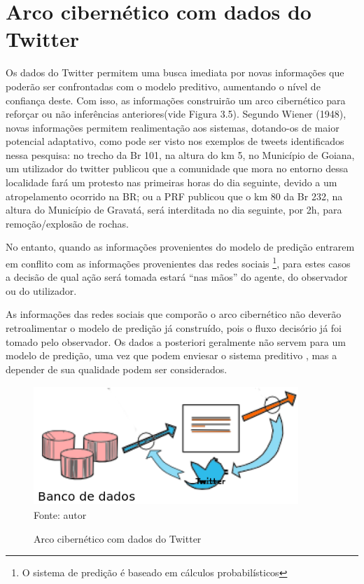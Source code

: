 \section{Arco cibernético com dados do Twitter}

Os dados do Twitter permitem uma busca imediata por novas informações que poderão ser confrontadas com o 
modelo preditivo, aumentando o nível de confiança deste. Com isso, as informações construirão um arco cibernético para reforçar ou não inferências anteriores(vide Figura 3.5). Segundo Wiener (1948), novas informações permitem realimentação aos sistemas, dotando-os de maior potencial adaptativo, como pode ser visto nos exemplos de tweets identificados nessa pesquisa: no trecho da Br 101, na altura do km 5, no 
Município de Goiana, um utilizador do twitter publicou que a comunidade que mora no entorno dessa localidade fará um protesto nas primeiras horas do dia seguinte, devido a um  
atropelamento ocorrido na BR; ou a PRF publicou que o km 80 da Br 232, na altura do Município de Gravatá, será interditada no dia seguinte, por 2h, para 
remoção/explosão de rochas.

No entanto, quando as informações provenientes do modelo de predição entrarem em conflito com as informações 
provenientes das redes sociais \footnote{O sistema de predição é baseado em cálculos probabilísticos}, para estes casos a decisão de qual ação será tomada estará ``nas mãos'' do agente, do observador ou do utilizador.

As informações das redes sociais que comporão o arco cibernético não deverão retroalimentar o modelo de predição já construído, pois o fluxo decisório já foi tomado pelo observador. Os dados a posteriori geralmente não servem para um modelo de predição, uma vez que podem enviesar o sistema preditivo {, mas a depender de sua qualidade podem ser considerados}.

\begin{figure}[ht]
	\centering
	\caption{Arco cibernético com dados do Twitter}
	\includegraphics[width=100mm, height=45mm]{Figuras/Metodologia/ArcoCibernetico.png}\\
	\tiny Fonte: autor
\end{figure}


